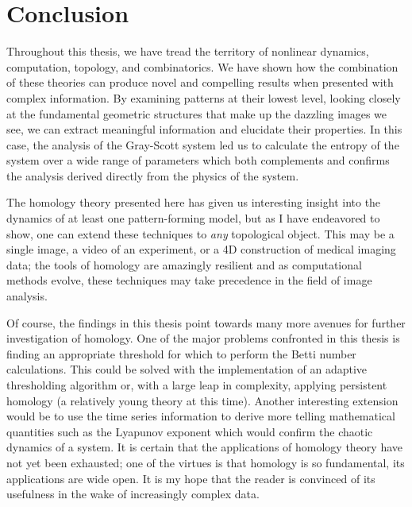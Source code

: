\chapter*{Conclusion}
	\setcounter{chapter}{4}
	\setcounter{section}{0}
	
Throughout this thesis, we have tread the territory of nonlinear dynamics, computation, topology, and combinatorics. We have shown how the combination of these theories can produce novel and compelling results when presented with complex information. By examining patterns at their lowest level, looking closely at the fundamental geometric structures that make up the dazzling images we see, we can extract meaningful information and elucidate their properties. In this case, the analysis of the Gray-Scott system led us to calculate the entropy of the system over a wide range of parameters which both complements and confirms the analysis derived directly from the physics of the system.

The homology theory presented here has given us interesting insight into the dynamics of at least one pattern-forming model, but as I have endeavored to show, one can extend these techniques to \textit{any} topological object. This may be a single image, a video of an experiment, or a 4D construction of medical imaging data; the tools of homology are amazingly resilient and as computational methods evolve, these techniques may take precedence in the field of image analysis.

Of course, the findings in this thesis point towards many more avenues for further investigation of homology. One of the major problems confronted in this thesis is finding an appropriate threshold for which to perform the Betti number calculations. This could be solved with the implementation of an adaptive thresholding algorithm or, with a large leap in complexity, applying persistent homology (a relatively young theory at this time). Another interesting extension would be to use the time series information to derive more telling mathematical quantities such as the Lyapunov exponent which would confirm the chaotic dynamics of a system. It is certain that the applications of homology theory have not yet been exhausted; one of the virtues is that homology is so fundamental, its applications are wide open. It is my hope that the reader is convinced of its usefulness in the wake of increasingly complex data.